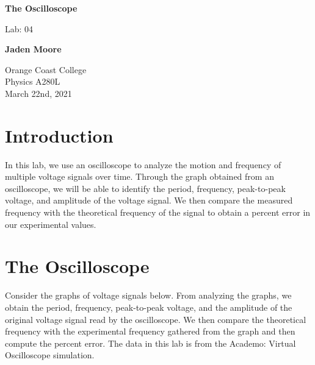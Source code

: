 \documentclass[12pt]{article}
\begin{document}

\begin{titlepage}
    \begin{center}
        \vspace*{1cm}
        \textbf{The Oscilloscope}

        \vspace{0.5cm}
        Lab: 04

        \vspace{1cm}

        \textbf{Jaden Moore}

        \vfill

        Orange Coast College\\
        Physics A280L\\
        March 22nd, 2021

    \end{center}
\end{titlepage}

\pagestyle{fancy}
\fancyhf{}
\setlength{\headheight}{15pt}
\cfoot{\thepage}

\section{Introduction}
In this lab, we use an oscilloscope to analyze the motion and frequency of multiple voltage signals over time. Through the graph obtained from an oscilloscope, we will be able to identify the period, frequency, peak-to-peak voltage, and amplitude of the voltage signal. We then compare the measured frequency with the theoretical frequency of the signal to obtain a percent error in our experimental values.

\section{The Oscilloscope}
Consider the graphs of voltage signals below. From analyzing the graphs, we obtain the period, frequency, peak-to-peak voltage, and the amplitude of the original voltage signal read by the oscilloscope. We then compare the theoretical frequency with the experimental frequency gathered from the graph and then compute the percent error. The data in this lab is from the Academo: Virtual Oscilloscope simulation.
\end{document}
